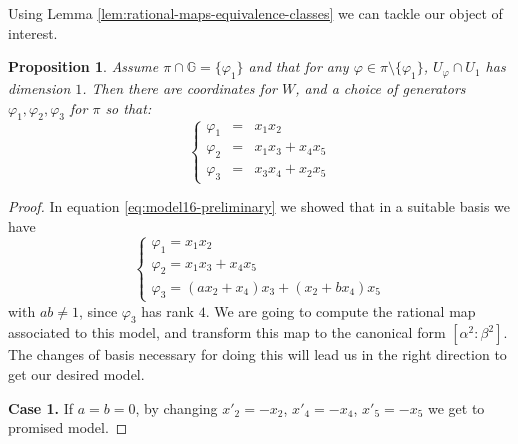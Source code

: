 \documentclass[10pt,reqno]{amsart}
\newcommand{\GG}{\mathbb{G}}
\renewcommand{\a}{\alpha}
\renewcommand{\b}{\beta}
\newcommand{\f}{\varphi}
\newtheorem{proposition}[theorem]{Proposition}
\theoremstyle{definition}
\begin{document}
\noindent Using Lemma \ref{lem:rational-maps-equivalence-classes} we can tackle our object of interest. 

\begin{proposition}\label{prop:case5-3-16}
Assume $\pi \cap \GG=\{\f_1\}$ and that for any $\f \in \pi \setminus \{\f_1\}$, $U_{\f} \cap U_1$ has dimension $1$. Then there are coordinates for $W$, and a choice of generators $\f_1, \f_2, \f_3$ for $\pi$ so that:
\[ 
\left\{\begin{array}{ccl}
 \f_1 & = & x_1x_2\\
 \f_2 & = & x_1x_3+x_4x_5\\
 \f_3 & = & x_3x_4+x_2x_5
\end{array}\right.
\]
\end{proposition}
\begin{proof}
In equation \eqref{eq:model16-preliminary} we showed that in a suitable basis we have
\[
\begin{cases}
    \f_1=x_1x_2 \\
    \f_2=x_1x_3+x_4x_5 \\
    \f_3=(ax_2+x_4)x_3+(x_2+bx_4)x_5
\end{cases}
\]
with $ab \ne 1$, since $\f_3$ has rank $4$. We are going to compute the rational map associated to this model, and transform this map to the canonical form $[\a^2:\b^2]$. The changes of basis necessary for doing this will lead us in the right direction to get our desired model.

\noindent \textbf{Case 1.} If $a=b=0$, by changing $x'_2=-x_2$, $x'_4=-x_4$, $x'_5=-x_5$ we get to promised model.

\medskip 


\end{proof}
\end{document}
